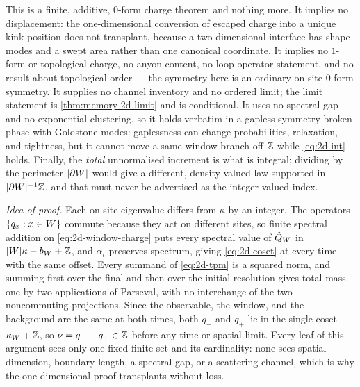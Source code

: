 \begin{scope}
This is a finite, additive, $0$-form charge theorem and nothing more. It
implies no displacement: the one-dimensional conversion of escaped charge into
a unique kink position does not transplant, because a two-dimensional
interface has shape modes and a swept area rather than one canonical
coordinate. It implies no $1$-form or topological charge, no anyon content, no
loop-operator statement, and no result about topological order --- the
symmetry here is an ordinary on-site $0$-form symmetry. It supplies no channel
inventory and no ordered limit; the limit statement is
\cref{thm:memory-2d-limit} and is conditional. It uses no spectral gap and no
exponential clustering, so it holds verbatim in a gapless
symmetry-broken phase with Goldstone modes: gaplessness can change
probabilities, relaxation, and tightness, but it cannot move a same-window
branch off $\mathbb{Z}$ while \eqref{eq:2d-int} holds. Finally, the \emph{total}
unnormalised increment is what is integral; dividing by the perimeter
$\lvert \partial W\rvert$ would give a different, density-valued law supported in
$\lvert \partial W\rvert^{-1}\mathbb{Z}$, and that must never be advertised as the
integer-valued index.
\end{scope}

\emph{Idea of proof.} Each on-site eigenvalue differs from $\kappa$ by an
integer. The operators $\{q_x:x\in W\}$ commute because they act on
different sites, so finite spectral addition on \eqref{eq:2d-window-charge}
puts every spectral value of $\hat{Q}_W$ in
$\lvert W\rvert\kappa-b_W+\mathbb{Z}$, and $\alpha_t$ preserves spectrum, giving
\eqref{eq:2d-coset} at every time with the same offset. Every summand of
\eqref{eq:2d-tpm} is a squared norm, and summing first over the final and then
over the initial resolution gives total mass one by two applications of
Parseval, with no interchange of the two noncommuting projections. Since the
observable, the window, and the background are the same at both times, both
$q_-$ and $q_+$ lie in the single coset $\kappa_W+\mathbb{Z}$, so
$\nu=q_--q_+\in\mathbb{Z}$ before any time or spatial limit. Every leaf of this
argument sees only one fixed finite set and its cardinality: none sees spatial
dimension, boundary length, a spectral gap, or a scattering channel, which is
why the one-dimensional proof transplants without loss.


